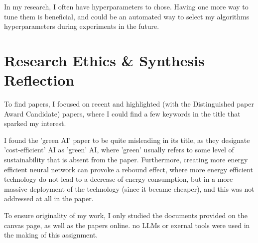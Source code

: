 \documentclass[11pt]{article}
\begin{document}
\medskip

In my research, I often have hyperparameters to chose. Having one more way to tune them is beneficial, and could be an automated way to select my algorithms hyperparameters during experiments in the future.

\medskip

\section{Research Ethics \& Synthesis Reflection}
To find papers, I focused on recent and highlighted (with the Distinguished paper Award Candidate) papers, where I could find a few keywords in the title that sparked my interest.

\medskip

I found the 'green AI' paper to be quite misleading in its title, as they designate 'cost-efficient' AI as 'green' AI, where 'green' usually refers to some level of sustainability that is absent from the paper. Furthermore, creating more energy efficient neural network can provoke a rebound effect, where more energy efficient technology do not lead to a decrease of energy consumption, but in a more massive deployment of the technology (since it became cheaper), and this was not addressed at all in the paper.

\medskip

To ensure originality of my work, I only studied the documents provided on the canvas page, as well as the papers online. no LLMs or exernal tools were used in the making of this assignment.
\printbibliography
\end{document}
